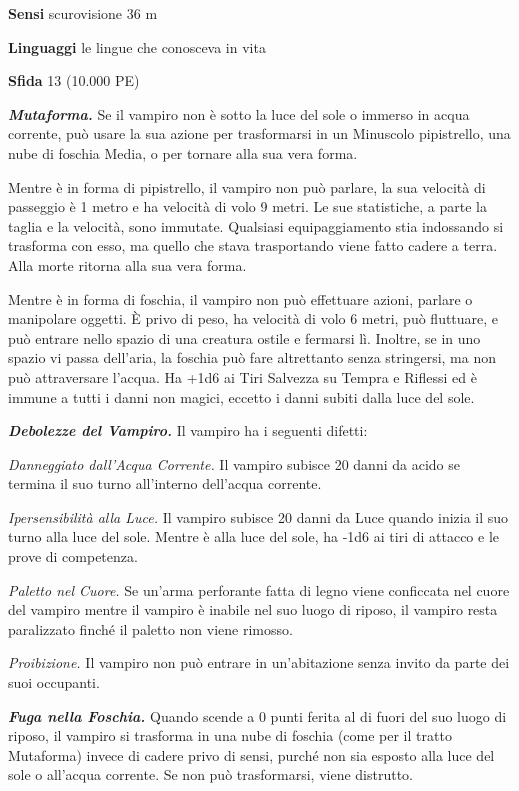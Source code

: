\begin{multicols}{2}
\textbf{Sensi} scurovisione 36 m

\textbf{Linguaggi} le lingue che conosceva in vita

\textbf{Sfida} 13 (10.000 PE)

\emph{\textbf{Mutaforma.}} Se il vampiro non è sotto la luce del sole o immerso in acqua corrente, può usare la sua azione per trasformarsi in un Minuscolo pipistrello, una nube di foschia Media, o per tornare alla sua vera forma.

Mentre è in forma di pipistrello, il vampiro non può parlare, la sua velocità di passeggio è 1 metro e ha velocità di volo 9 metri. Le sue statistiche, a parte la taglia e la velocità, sono immutate. Qualsiasi equipaggiamento stia indossando si trasforma con esso, ma quello che stava trasportando viene fatto cadere a terra. Alla morte ritorna alla sua vera forma.

Mentre è in forma di foschia, il vampiro non può effettuare azioni, parlare o manipolare oggetti. È privo di peso, ha velocità di volo 6 metri, può fluttuare, e può entrare nello spazio di una creatura ostile e fermarsi lì. Inoltre, se in uno spazio vi passa dell'aria, la foschia può fare altrettanto senza stringersi, ma non può attraversare l'acqua. Ha +1d6 ai Tiri Salvezza su Tempra e Riflessi ed è immune a tutti i danni non magici, eccetto i danni subiti dalla luce del
sole.

\emph{\textbf{Debolezze del Vampiro.}} Il vampiro ha i seguenti difetti:

\emph{Danneggiato dall'Acqua Corrente.} Il vampiro subisce 20 danni da acido se termina il suo turno all'interno dell'acqua corrente.

\emph{Ipersensibilità alla Luce.} Il vampiro subisce 20 danni da Luce quando inizia il suo turno alla luce del sole. Mentre è alla luce del sole, ha -1d6 ai tiri di attacco e le prove di competenza. 

\emph{Paletto nel Cuore.} Se un'arma perforante fatta di legno viene conficcata nel cuore del vampiro mentre il vampiro è inabile nel suo luogo di riposo, il vampiro resta paralizzato finché il paletto non viene rimosso.

\emph{Proibizione.} Il vampiro non può entrare in un'abitazione senza invito da parte dei suoi occupanti.

\emph{\textbf{Fuga nella Foschia.}} Quando scende a 0 punti ferita al di fuori del suo luogo di riposo, il vampiro si trasforma in una nube di foschia (come per il tratto Mutaforma) invece di cadere privo di sensi, purché non sia esposto alla luce del sole o all'acqua corrente. Se non può trasformarsi, viene distrutto.


\end{multicols}

